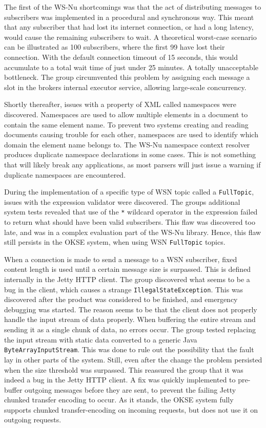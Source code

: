 The first of the WS-Nu shortcomings was that the act of distributing messages to subscribers was implemented in a procedural and synchronous way. This meant that any subscriber that had lost its internet connection, or had a long latency, would cause the remaining subscribers to wait. A theoretical worst-case scenario can be illustrated as 100 subscribers, where the first 99 have lost their connection. With the default connection timeout of 15 seconds, this would accumulate to a total wait time of just under 25 minutes. A totally unacceptable bottleneck. The group circumvented this problem by assigning each message a slot in the brokers internal executor service, allowing large-scale concurrency.

Shortly thereafter, issues with a property of XML called namespaces were discovered. Namespaces are used to allow multiple elements in a document to contain the same element name. To prevent two systems creating and reading documents causing trouble for each other, namespaces are used to identify which domain the element name belongs to. The WS-Nu namespace context resolver produces duplicate namespace declarations in some cases. This is not something that will likely break any applications, as most parsers will just issue a warning if duplicate namespaces are encountered.

During the implementation of a specific type of WSN topic called a \verb!FullTopic!, issues with the expression validator were discovered. The groups additional system tests revealed that use of the \verb!*! wildcard operator in the expression failed to return what should have been valid subscribers. This flaw was discovered too late, and was in a complex evaluation part of the WS-Nu library. Hence, this flaw still persists in the OKSE system, when using WSN \verb!FullTopic! topics.

When a connection is made to send a message to a WSN subscriber, fixed content length is used until a certain message size is surpassed. This is defined internally in the Jetty HTTP client. The group discovered what seems to be a bug in the client, which causes a strange \verb!IllegalStateException!. This was discovered after the product was considered to be finished, and emergency debugging was started. The reason seems to be that the client does not properly handle the input stream of data properly. When buffering the entire stream and sending it as a single chunk of data, no errors occur. The group tested replacing the input stream with static data converted to a generic Java \verb!ByteArrayInputStream!. This was done to rule out the possibility that the fault lay in other parts of the system. Still, even after the change the problem persisted when the size threshold was surpassed. This reassured the group that it was indeed a bug in the Jetty HTTP client. A fix was quickly implemented to pre-buffer outgoing messages before they are sent, to prevent the failing Jetty chunked transfer encoding to occur. As it stands, the OKSE system fully supports chunked transfer-encoding on incoming requests, but does not use it on outgoing requests.

